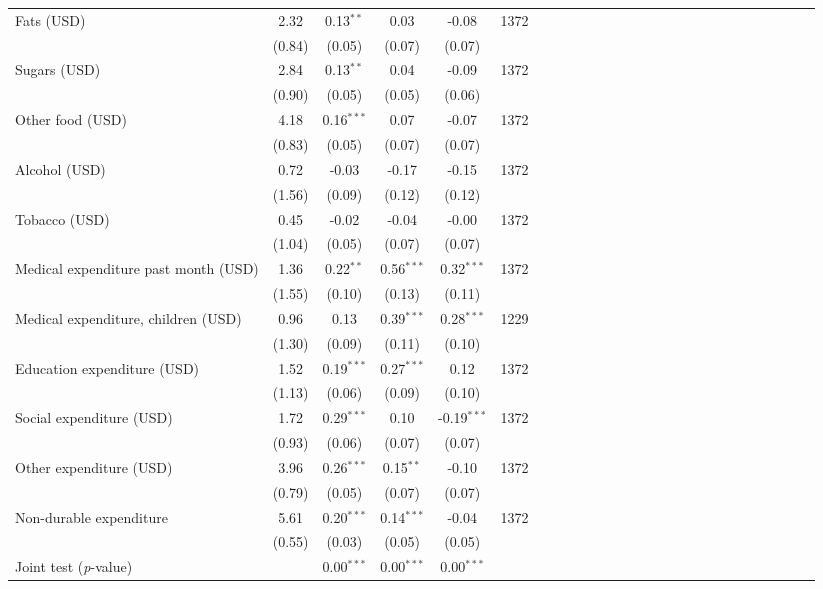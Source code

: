 {\begin{tabular}{l*{5}{SSSSc}}
\hspace{0.2cm}Fats (USD)&     2.32&0.13$^{**}$&     0.03&    -0.08&     1372\\
          &   (0.84)&   (0.05)&   (0.07)&   (0.07)&         \\
\hspace{0.2cm}Sugars (USD)&     2.84&0.13$^{**}$&     0.04&    -0.09&     1372\\
          &   (0.90)&   (0.05)&   (0.05)&   (0.06)&         \\
\hspace{0.2cm}Other food (USD)&     4.18&0.16$^{***}$&     0.07&    -0.07&     1372\\
          &   (0.83)&   (0.05)&   (0.07)&   (0.07)&         \\
Alcohol (USD)&     0.72&    -0.03&    -0.17&    -0.15&     1372\\
          &   (1.56)&   (0.09)&   (0.12)&   (0.12)&         \\
Tobacco (USD)&     0.45&    -0.02&    -0.04&    -0.00&     1372\\
          &   (1.04)&   (0.05)&   (0.07)&   (0.07)&         \\
Medical expenditure past month (USD)&     1.36&0.22$^{**}$&0.56$^{***}$&0.32$^{***}$&     1372\\
          &   (1.55)&   (0.10)&   (0.13)&   (0.11)&         \\
\hspace{0.2cm}Medical expenditure, children (USD)&     0.96&     0.13&0.39$^{***}$&0.28$^{***}$&     1229\\
          &   (1.30)&   (0.09)&   (0.11)&   (0.10)&         \\
Education expenditure (USD)&     1.52&0.19$^{***}$&0.27$^{***}$&     0.12&     1372\\
          &   (1.13)&   (0.06)&   (0.09)&   (0.10)&         \\
Social expenditure (USD)&     1.72&0.29$^{***}$&     0.10&-0.19$^{***}$&     1372\\
          &   (0.93)&   (0.06)&   (0.07)&   (0.07)&         \\
Other expenditure (USD)&     3.96&0.26$^{***}$&0.15$^{**}$&    -0.10&     1372\\
          &   (0.79)&   (0.05)&   (0.07)&   (0.07)&         \\
Non-durable expenditure&     5.61&0.20$^{***}$&0.14$^{***}$&    -0.04&     1372\\
          &   (0.55)&   (0.03)&   (0.05)&   (0.05)&         \\
\midrule Joint test (\emph{p}-value)&         &{0.00$^{***}$}&{0.00$^{***}$}&{0.00$^{***}$}&         \\
\bottomrule
\end{tabular}
}
